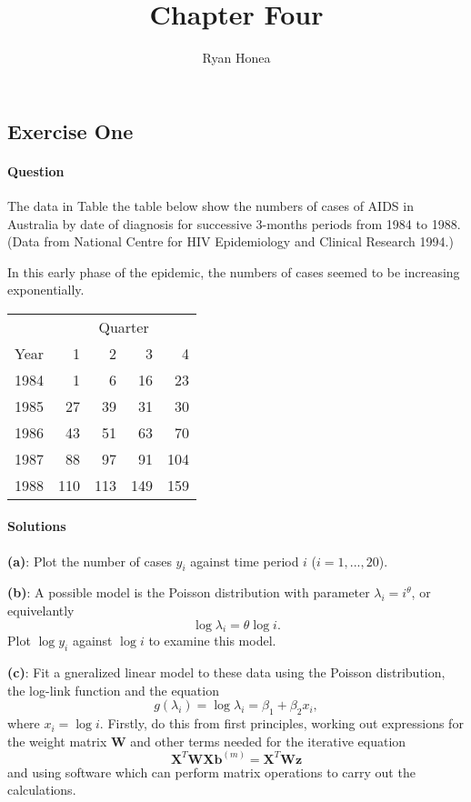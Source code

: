 \documentclass[]{article}
\title{Chapter Four}
\author{Ryan Honea}
\date{}
\let\oldparagraph\paragraph
\renewcommand{\paragraph}[1]{\oldparagraph{#1}\mbox{}}
\begin{document}
\maketitle

\subsection{Exercise One}\label{exercise-one}

\paragraph{Question}\label{question}

The data in Table the table below show the numbers of cases of AIDS in
Australia by date of diagnosis for successive 3-months periods from 1984
to 1988. (Data from National Centre for HIV Epidemiology and Clinical
Research 1994.)

In this early phase of the epidemic, the numbers of cases seemed to be
increasing exponentially.

\begin{center}
\begin{tabular}{@{}crrrr@{}}
\toprule
     & \multicolumn{4}{c}{Quarter} \\
Year & 1     & 2     & 3    & 4    \\ \midrule
1984 & 1     & 6     & 16   & 23   \\
1985 & 27    & 39    & 31   & 30   \\
1986 & 43    & 51    & 63   & 70   \\
1987 & 88    & 97    & 91   & 104  \\
1988 & 110   & 113   & 149  & 159  \\ \bottomrule
\end{tabular}
\end{center}

\paragraph{Solutions}\label{solutions}

\textbf{(a)}: Plot the number of cases \(y_i\) against time period \(i\)
(\(i = 1,...,20\)).

\textbf{(b)}: A possible model is the Poisson distribution with
parameter \(\lambda_i = i^\theta\), or equivelantly \[
\log\lambda_i = \theta\log i.
\] Plot \(\log y_i\) against \(\log i\) to examine this model.

\textbf{(c)}: Fit a gneralized linear model to these data using the
Poisson distribution, the log-link function and the equation \[
g(\lambda_i) = \log\lambda_i = \beta_1 + \beta_2x_i,
\] where \(x_i = \log i\). Firstly, do this from first principles,
working out expressions for the weight matrix \(\bm{W}\) and other terms
needed for the iterative equation \[
\bm{X}^T\bm{WXb}^{(m)} = \bm{X}^T\bm{Wz}
\] and using software which can perform matrix operations to carry out
the calculations.
\end{document}
